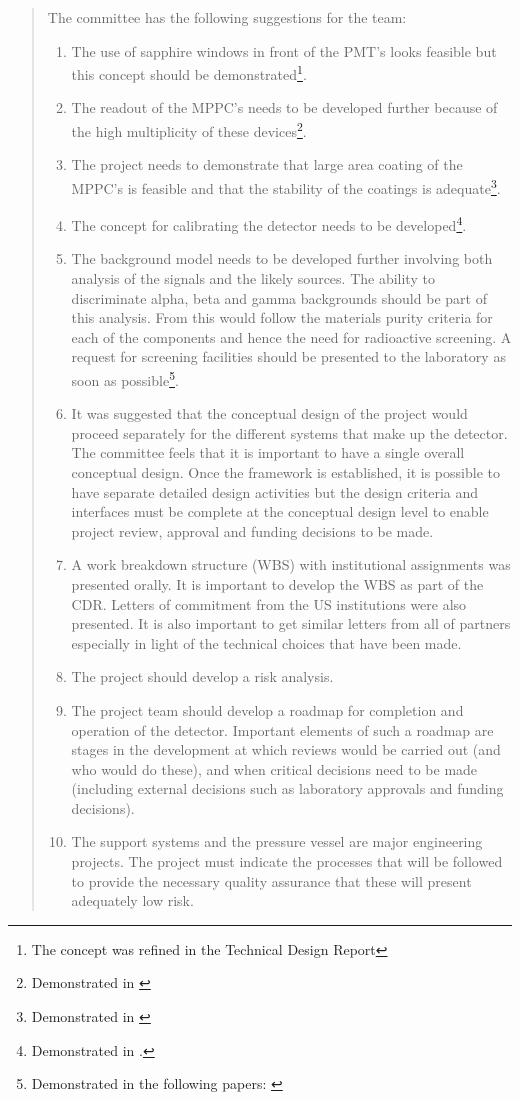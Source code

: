 \begin{quotation}
The committee has the following suggestions for the team:
 \begin{enumerate}
\item The use of sapphire windows in front of the PMT’s looks feasible but this concept should be demonstrated\footnote{The concept was refined in the Technical Design Report\cite{Alvarez:2012flf}}.
\item The readout of the MPPC’s needs to be developed further because of the high multiplicity of these devices\footnote{Demonstrated in \cite{Abazajian:2012ys}}.
\item The project needs to demonstrate that large area coating of the MPPC’s is feasible and that the stability of the coatings is adequate\footnote{Demonstrated in \cite{Alvarez:2012ub}}.
\item The concept for calibrating the detector needs to be developed\footnote{Demonstrated
in \cite{Alvarez:2012haa}.}. 
\item The background model needs to be developed further involving both analysis of the signals and the likely sources. The ability to discriminate alpha, beta and gamma backgrounds should be part of this analysis. From this would follow the materials purity criteria for each of the components and hence the need for radioactive screening. A request for screening facilities should be presented to the laboratory as soon as possible\footnote{Demonstrated
in the following papers: \cite{Alvarez:2012as,Alvarez:2013wxj,Dafni:2014yja,Alvarez:2014kvs,Cebrian:2015jna}}.
\item It was suggested that the conceptual design of the project would proceed separately for the different systems that make up the detector. The committee feels that it is important to have a single overall conceptual design. Once the framework is established, it is possible to have separate detailed design activities but the design criteria and interfaces must be complete at the conceptual design level to enable project review, approval and funding decisions to be made.
\item A work breakdown structure (WBS) with institutional assignments was presented orally. It is important to develop the WBS as part of the CDR. Letters of commitment from the US institutions were also presented. It is also important to get similar letters from all of partners especially in light of the technical choices that have been made.
\item The project should develop a risk analysis. 
\item The project team should develop a roadmap for completion and operation of the detector. Important elements of such a roadmap are stages in the development at which reviews would be carried out (and who would do these), and when critical decisions need to be made (including external decisions such as laboratory approvals and funding decisions).
\item The support systems and the pressure vessel are major engineering projects. The project must indicate the processes that will be followed to provide the necessary quality assurance that these will present adequately low risk.
\end{enumerate}


\end{quotation}
